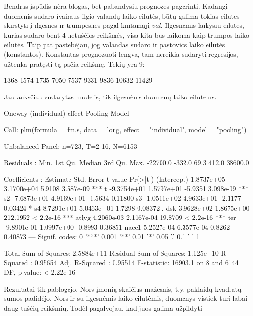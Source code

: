 \documentclass[a4paper]{article}
\begin{document}
Bendras įspūdis nėra blogas, bet pabandysiu prognozes
pagerinti. Kadangi duomenis sudaro įvairaus ilgio valandų laiko eilutės, būtų
galima tokias eilutes skirstyti į ilgesnes ir trumpesnes pagal
kintamąjį $val$. Ilgesnėmis laikysiu eilutes, kurias sudaro bent 4
netuščios reikšmės, visa kita bus laikoma kaip trumpos laiko eilutės. 
Taip pat pastebėjau, jog valandas sudaro ir pastovios
laiko eilutės (konstantos). Konstantas prognozuoti lengva, tam
nereikia sudaryti regresijos, užtenka pratęsti tą pačia reikšmę. Tokių
yra 9:
\begin{Schunk}
\begin{Soutput}
[1]  1368  1574  1735  7050  7537  9331  9836 10632 11429
\end{Soutput}
\end{Schunk}
Jau anksčiau sudarytas modelis, tik ilgesnėms duomenų laiko eilutems:
\begin{Schunk}
\begin{Soutput}
Oneway (individual) effect Pooling Model

Call:
plm(formula = fm.s, data = long, effect = "individual", model = "pooling")

Unbalanced Panel: n=723, T=2-16, N=6153

Residuals :
    Min.  1st Qu.   Median  3rd Qu.     Max. 
-22700.0   -332.0     69.3    412.0  38600.0 

Coefficients :
               Estimate  Std. Error  t-value  Pr(>|t|)    
(Intercept)  1.8737e+05  3.1700e+04   5.9108 3.587e-09 ***
t           -9.3754e+01  1.5797e+01  -5.9351 3.098e-09 ***
s2          -7.6873e+01  4.9169e+01  -1.5634   0.11800    
s3          -1.0511e+02  4.9633e+01  -2.1177   0.03424 *  
s4           8.7291e+01  5.0463e+01   1.7298   0.08372 .  
dsk          3.9628e+02  1.8675e+00 212.1952 < 2.2e-16 ***
atlyg        4.2060e-03  2.1167e-04  19.8709 < 2.2e-16 ***
ter         -9.8901e-01  1.0997e+00  -0.8993   0.36851    
nace1        5.2527e-04  6.3577e-04   0.8262   0.40873    
---
Signif. codes:  0 '***' 0.001 '**' 0.01 '*' 0.05 '.' 0.1 ' ' 1 

Total Sum of Squares:    2.5884e+11
Residual Sum of Squares: 1.125e+10
R-Squared      :  0.95654 
      Adj. R-Squared :  0.95514 
F-statistic: 16903.1 on 8 and 6144 DF, p-value: < 2.22e-16
\end{Soutput}
\end{Schunk}
Rezultatai tik pablogėjo. Nors įmonių skaičius mažesnis, t.y. paklaidų
kvadratų sumos padidėjo.
Nors ir su ilgesnėmis laiko eilutėmis, duomenys vistiek turi labai
daug tuščių reikšmių. Todėl pagalvojau, kad juos galima užpildyti
\end{document}
